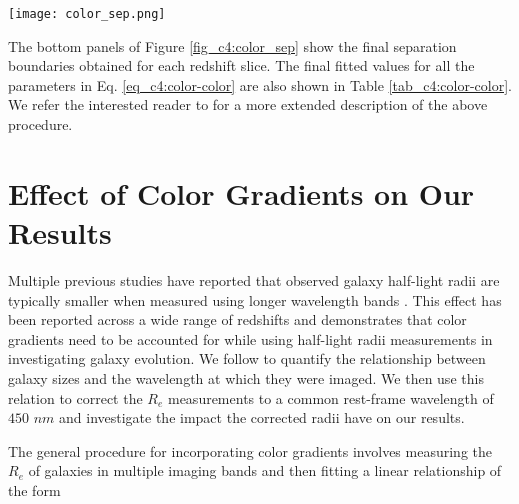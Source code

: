 \begin{figure*}[htb]
    \centering
    \texttt{[image: color\_sep.png]}
    \caption{ (\textit{Top Row}): The distribution of SDSS rest-frame \uband{}-\rb{} colors are shown for the four different redshift slices. The solid orange lines depict kernel density estimation (KDE) fits to ascertain the \uband{}-\rb{} probability density function. The dashed vertical line marks the local minima (obtained using the KDE estimate) between the two peaks of the \uband{}-\rb{} distribution. (\textit{Bottom Row}): The distribution of galaxies on the SDSS rest-frame \uband-\rb{} v/s \rb{}-\zb{} color-color plane are shown for the four different redshift slices. The dashed lines delineate the separation boundaries between the quiescent and star-forming sub-populations. See the text for more details on how the separation boundaries are obtained.}
    \label{fig_c4:color_sep}
\end{figure*}

The bottom panels of Figure \ref{fig_c4:color_sep} show the final separation boundaries obtained for each redshift slice. The final fitted values for all the parameters in Eq. \ref{eq_c4:color-color} are also shown in Table \ref{tab_c4:color-color}. We refer the interested reader to \citet{Kawin16} for a more extended description of the above procedure. 

\section{Effect of Color Gradients on Our Results} \label{sec_c4:ap:size_corr}
Multiple previous studies have reported that observed galaxy half-light radii are typically smaller when measured using longer wavelength bands \citep[e.g.,][]{barbera_10,kelvin_12,vdw_14,lange_15,hsc_mass_size}. This effect has been reported across a wide range of redshifts and demonstrates that color gradients need to be accounted for while using half-light radii measurements in investigating galaxy evolution. We follow \citet{vdw_14} to quantify the relationship between galaxy sizes and the wavelength at which they were imaged. We then use this relation to correct the $R_e$ measurements to a common rest-frame wavelength of $450\,\,nm$ and investigate the impact the corrected radii have on our results. 

The general procedure for incorporating color gradients involves measuring the $R_e$ of galaxies in multiple imaging bands and then fitting a linear relationship of the form 

